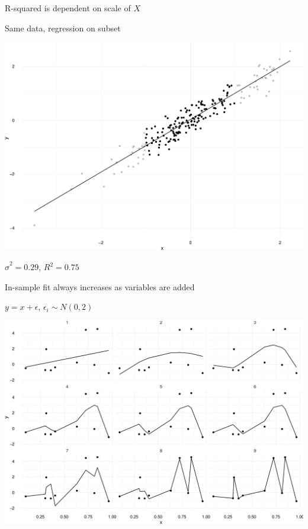 \documentclass[ignorenonframetext,]{beamer}
\begin{document}
\begin{frame}{R-squared is dependent on scale of \(X\)}

Same data, regression on subset

\includegraphics{r2_regression_fit_files/figure-beamer/unnamed-chunk-3-1.pdf}

\(\hat{\sigma}^2 = 0.29\), \(R^2 = 0.75\)

\end{frame}

\begin{frame}{In-sample fit always increases as variables are added}

\(y = x + \epsilon\), \(\epsilon_i \sim N(0, 2)\)

\includegraphics{r2_regression_fit_files/figure-beamer/unnamed-chunk-5-1.pdf}

\end{frame}
\end{document}
